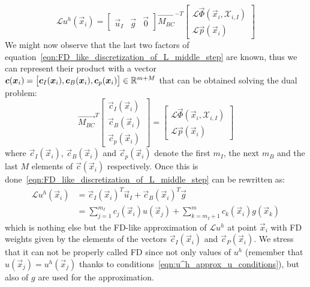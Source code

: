 \begin{equation}
	\label{eqn:FD_like_discretization_of_L_middle_step}
	\mathcal{L} u^h(\vec{x}_i) = 
	\begin{bmatrix}
		\vec{u}_I  &  \vec{g}  &  \vec{0}
	\end{bmatrix}
	\vec{M_{BC}}^{-T}
	\begin{bmatrix}
		\mathcal{L} \vec{\Phi}(\vec{x}_i, \mathcal{X}_{i,I})  \\
		\mathcal{L} \vec{p}(\vec{x}_i)
	\end{bmatrix}	
\end{equation}
We might now observe that the last two factors of equation~\eqref{eqn:FD_like_discretization_of_L_middle_step} are known, thus we can represent their product with a vector $\boldsymbol{c}(\boldsymbol{x}_i) = \bigl[ \boldsymbol{c}_I(\boldsymbol{x}_i), \boldsymbol{c}_B(\boldsymbol{x}_i), \boldsymbol{c}_p(\boldsymbol{x}_i) \bigr] \in \mathbb{R}^{m+M}$ that can be obtained solving the dual problem:
\begin{equation}
\label{eqn:row_of_C_system}
	\vec{M_{BC}}^T
	\begin{bmatrix}
		\vec{c}_I(\vec{x}_i)  \\
		\vec{c}_B(\vec{x}_i)  \\
		\vec{c}_p(\vec{x}_i)
   \end{bmatrix} = 
	\begin{bmatrix}
		\mathcal{L} \vec{\Phi}(\vec{x}_i, \mathcal{X}_{i,I})  \\
		\mathcal{L} \vec{p}(\vec{x}_i)
	\end{bmatrix}
\end{equation}
where $\vec{c}_I(\vec{x}_i)$, $\vec{c}_B(\vec{x}_i)$ and $\vec{c}_p(\vec{x}_i)$ denote the first $m_I$, the next $m_B$ and the last $M$ elements of $\vec{c}(\vec{x}_i)$ respectively.
Once this is done~\eqref{eqn:FD_like_discretization_of_L_middle_step} can be rewritten as:
\begin{equation}
	\begin{aligned}
		\mathcal{L} u^h(\vec{x}_i) & = \vec{c}_I(\vec{x}_i)^T \vec{u}_I + \vec{c}_B(\vec{x}_i)^T \vec{g}  \\
								   & = \sum_{j=1}^{m_I} c_j(\vec{x}_i) u(\vec{x}_j) + \sum_{k=m_I+1}^{m} c_k(\vec{x}_i)g(\vec{x}_k)
	\end{aligned}
\end{equation}
which is nothing else but the FD-like approximation of $\mathcal{L}u^h$ at point $\vec{x}_i$ with FD weights given by the elements of the vectors $\vec{c}_I(\vec{x}_i)$ and $\vec{c}_P(\vec{x}_i)$. We stress that it can not be properly called FD since not only values of $u^h$ (remember that $u(\vec{x}_j) = u^h(\vec{x}_j)$ thanks to conditions~\eqref{eqn:u^h_approx_u_conditions}), but also of $g$ are used for the approximation.

